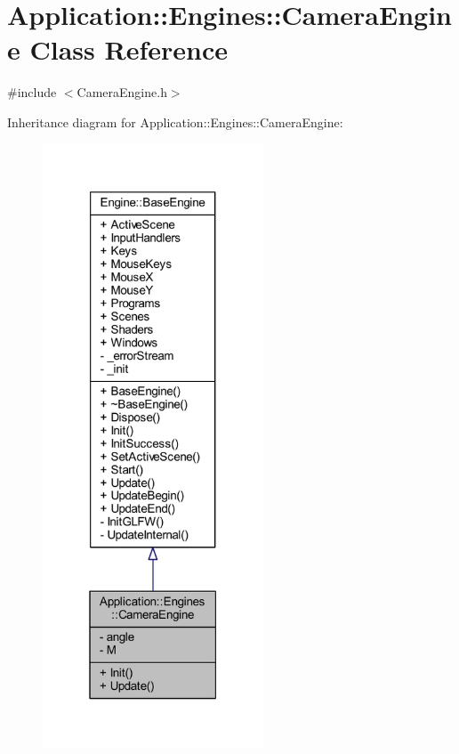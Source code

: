 \hypertarget{classApplication_1_1Engines_1_1CameraEngine}{}\section{Application\+:\+:Engines\+:\+:Camera\+Engine Class Reference}
\label{classApplication_1_1Engines_1_1CameraEngine}


{\ttfamily \#include $<$Camera\+Engine.\+h$>$}



Inheritance diagram for Application\+:\+:Engines\+:\+:Camera\+Engine\+:
\nopagebreak
\begin{figure}[H]
\begin{center}
\leavevmode
\includegraphics[width=186pt]{classApplication_1_1Engines_1_1CameraEngine__inherit__graph}
\end{center}
\end{figure}


